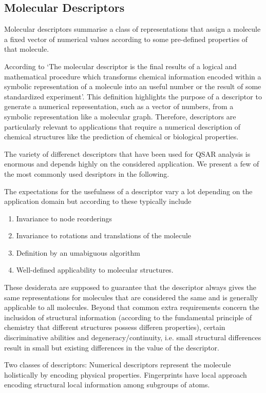 \subsection{Molecular Descriptors}
Molecular descriptors summarise a class of representations that assign a molecule a fixed vector of numerical values according to some pre-defined properties of that molecule. 

According to \cite{todeschini2008handbook} `The molecular descriptor is the final results of a logical and mathematical procedure which transforms chemical information encoded within a symbolic representation of a molecule into an useful number or the result of some standardized experiment'. This definition highlights the purpose of a descriptor to generate a numerical representation, such as a vector of numbers, from a symbolic representation like a molecular graph. Therefore, descriptors are particularly relevant to applications that require a numerical description of chemical structures like the prediction of chemical or biological properties.  

The variety of differenct descriptors that have been used for QSAR analysis is enormous and depends highly on the considered application. We present a few of the most commonly used desriptors in the following. 

The expectations for the usefulness of a descriptor vary a lot depending on the application domain but according to \cite{Mauri2016} these typically include
\begin{enumerate}
	\item Invariance to node reorderings
	\item Invariance to rotations and translations of the molecule
	\item Definition by an umabiguous algorithm
	\item Well-defined applicability to molecular structures.
\end{enumerate}
These desiderata are supposed to guarantee that the descriptor always gives the same representations for molecules that are considered the same and is generally applicable to all molecules. Beyond that common extra requirements concern the inclusidon of structural information (according to the fundamental principle of chemistry that different structures possess differen properties), certain discriminative abilities and degeneracy/continuity, i.e. small structural differences result in small but existing differences in the value of the descriptor. 

Two classes of descriptors: Numerical descriptors represent the molecule holistically by encoding physical properties. Fingerprints have local approach encoding structural local information among subgroups of atoms.
